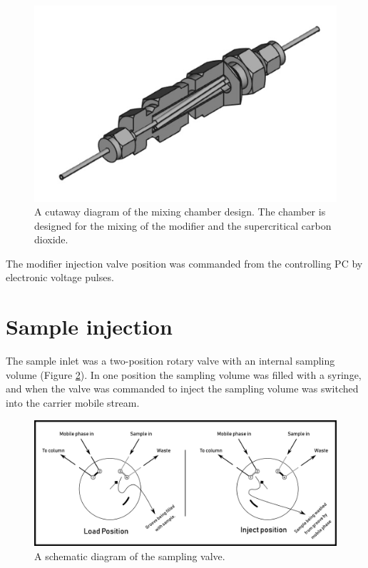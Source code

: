 \begin{figure}
\centering
\includegraphics[width=\textwidth]{Figures/MixingChamber.png}
\decoRule

\caption[A cutaway diagram of the mixing chamber]{A cutaway diagram of the
mixing chamber design. The chamber is designed for the mixing of the modifier
and the supercritical carbon dioxide.}

\label{fig:mixingchamber}
\end{figure}

The modifier injection valve position was commanded from the controlling PC by electronic
voltage pulses.

\section{Sample injection}
\label{sec:SFCInjection}

The sample inlet was a two-position rotary valve with an internal sampling volume
(Figure \ref{fig:samplingvalve}). In one position the sampling volume was filled
with a syringe, and when the valve was commanded to inject the sampling volume
was switched into the carrier mobile stream.

\begin{figure}
\centering
\includegraphics[width=\textwidth]{Figures/SampleValve.pdf}
\decoRule

\caption[Schematic diagram of the injection valve.]{A schematic diagram of the sampling valve. }

\label{fig:samplingvalve}
\end{figure}

